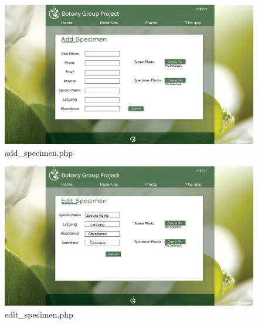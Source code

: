 \begin{landscape}
	\begin{figure}
                \centering
                \includegraphics[scale=0.4]{uiDesign/uiwebimages/addspecimen.png}
                \caption{add\_specimen.php}
                \label{fig:addSpecimen}
            \end{figure}
	
	\begin{figure}
                \centering
                \includegraphics[scale=0.4]{uiDesign/uiwebimages/editspecimen.png}
                \caption{edit\_specimen.php}
                \label{fig:editSpecimen}
            \end{figure}

\end{landscape}